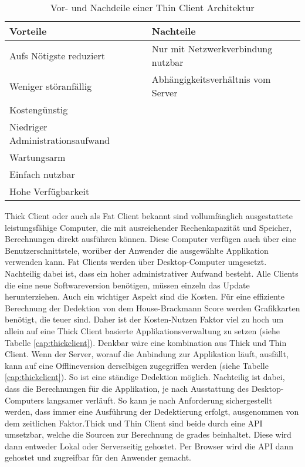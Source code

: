 \begin{table}[b]\vspace{1ex}\centering
  \begin{tabular*}{14cm}{l|l}
  \textbf{Vorteile} & \textbf{Nachteile}
  \\\hline\hline
  Aufs Nötigste reduziert          & Nur mit Netzwerkverbindung nutzbar   \\
  Weniger störanfällig             & Abhängigkeitsverhältnis vom Server   \\
  Kostengünstig                    &                                      \\
  Niedriger Administrationsaufwand &                                      \\
  Wartungsarm                      &                                      \\
  Einfach nutzbar                  &                                      \\
  Hohe Verfügbarkeit               &
  \\\hline
  \end{tabular*}
  \caption[Vor- und Nachteile von Thin Client]{Vor- und Nachdeile einer Thin Client Architektur}\label{cap:thinclient}
\vspace{1ex}\end{table}\label{table:thinclient}

Thick Client oder auch als Fat Client bekannt sind vollumfänglich ausgestattete leistungsfähige Computer, die mit ausreichender Rechenkapazität und Speicher, Berechnungen direkt ausführen können. Diese Computer verfügen auch über eine Benutzerschnittstele, worüber der Anwender die ausgewählte Applikation verwenden kann. Fat Clients werden über Desktop-Computer umgesetzt. Nachteilig dabei ist, dass ein hoher administrativer Aufwand besteht. Alle Clients die eine neue Softwareversion benötigen, müssen einzeln das Update herunterziehen. Auch ein wichtiger Aspekt sind die Kosten. Für eine effiziente Berechnung der Dedektion von dem House-Brackmann Score werden Grafikkarten benötigt, die teuer sind. Daher ist der Kosten-Nutzen Faktor viel zu hoch um allein auf eine Thick Client basierte Applikationsverwaltung zu setzen (siehe Tabelle \ref{cap:thickclient}).
Denkbar wäre eine kombination aus Thick und Thin Client. Wenn der Server, worauf die Anbindung zur Applikation läuft, ausfällt, kann auf eine Offlineversion derselbigen zugegriffen werden (siehe Tabelle \ref{cap:thickclient}). So ist eine ständige Dedektion möglich. Nachteilig ist dabei, dass die Berechnungen für die Applikation, je nach Ausstattung des Desktop-Computers langsamer verläuft. So kann je nach Anforderung sichergestellt werden, dass immer eine Ausführung der Dedektierung erfolgt, ausgenommen von dem zeitlichen Faktor.Thick und Thin Client sind beide durch eine API umsetzbar, welche die Sourcen zur Berechnung de grades beinhaltet. Diese wird dann entweder Lokal oder Serverseitig gehostet. Per Browser wird die API dann gehostet und zugreifbar für den Anwender gemacht.

